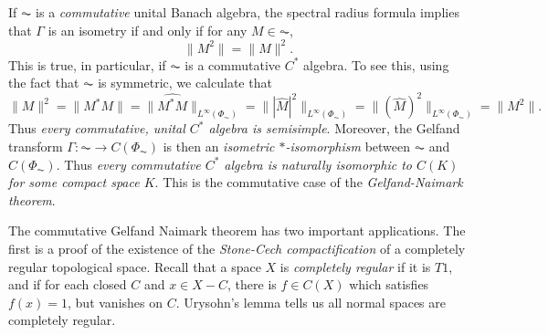 If $\AC$ is a \emph{commutative} unital Banach algebra, the spectral radius formula implies that $\Gamma$ is an isometry if and only if for any $M \in \AC$,
%
\[ \| M^2 \| = \| M \|^2. \]
%
This is true, in particular, if $\AC$ is a commutative $C^*$ algebra. To see this, using the fact that $\AC$ is symmetric, we calculate that
%
\[ \| M \|^2 = \| M^* M \| = \| \widehat{M^* M} \|_{L^\infty(\Phi_{\AC})} = \| |\widehat{M}|^2 \|_{L^\infty(\Phi_{\AC})} = \| (\widehat{M})^2 \|_{L^\infty(\Phi_{\AC})} = \| M^2 \|. \]
%
Thus \emph{every commutative, unital $C^*$ algebra is semisimple}. Moreover, the Gelfand transform $\Gamma: \AC \to C(\Phi_{\AC})$ is then an \emph{isometric $*$-isomorphism} between $\AC$ and $C(\Phi_{\AC})$. Thus \emph{every commutative $C^*$ algebra is naturally isomorphic to $C(K)$ for some compact space $K$}. This is the commutative case of the \emph{Gelfand-Naimark theorem}.

The commutative Gelfand Naimark theorem has two important applications. The first is a proof of the existence of the \emph{Stone-Cech compactification} of a completely regular topological space. Recall that a space $X$ is \emph{completely regular} if it is $T1$, and if for each closed $C$ and $x \in X - C$, there is $f \in C(X)$ which satisfies $f(x) = 1$, but vanishes on $C$. Urysohn's lemma tells us all normal spaces are completely regular.

